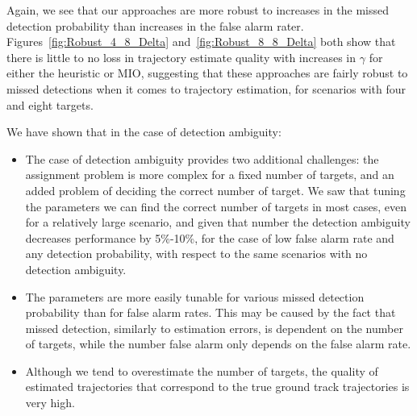 Again, we see that our approaches are more robust to increases in the missed detection probability than increases in the false alarm rater. Figures~\ref{fig:Robust_4_8_Delta} and~\ref{fig:Robust_8_8_Delta} both show that there is little to no loss in trajectory estimate quality with increases in $\gamma$ for either the heuristic or MIO, suggesting that these approaches are fairly robust to missed detections when it comes to trajectory estimation, for scenarios with four and eight targets. 

We have shown that in the case of detection ambiguity:
\begin{itemize}
\item The case of detection ambiguity provides two additional challenges: the assignment problem is more complex for a fixed number of targets, and an added problem of deciding the correct number of target. We saw that tuning the parameters we can find the correct number of targets in most cases, even for a relatively large scenario, and given that number the detection ambiguity decreases performance by 5\%-10\%,  for the case of low false alarm rate and any detection probability, with respect to the same scenarios with no detection ambiguity.
\item The parameters are more easily tunable for various missed detection probability than for false alarm rates. This may be caused by the fact that missed detection, similarly to estimation errors, is dependent on the number of targets, while the number false alarm only depends on the false alarm rate. 
\item Although we tend to overestimate the number of targets, the quality of estimated trajectories that correspond to the true ground track trajectories is very high. 
\end{itemize}